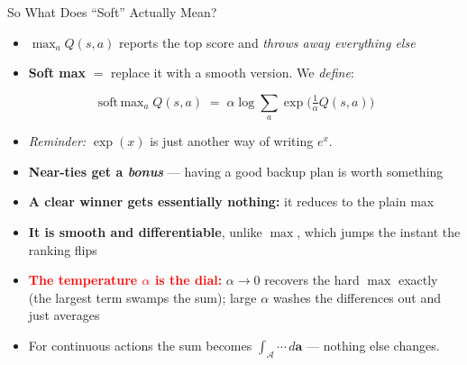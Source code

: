 \begin{frame}{So What Does ``Soft'' Actually Mean?}
\small
\begin{itemize}
    \item $\max_a Q(s,a)$ reports the top score and \emph{throws away everything else}
    \vspace{0.4em}
    \item \textbf{Soft max} $=$ replace it with a smooth version. We \emph{define}:
\end{itemize}
\vspace{-0.2em}
\[
\operatorname{soft\,max}_a Q(s,a) \;=\; \alpha \log \sum_a \exp\!\Big(\tfrac{1}{\alpha}Q(s,a)\Big)
\]
\vspace{-0.2em}
\begin{itemize}
    \item[] {\footnotesize \emph{Reminder:} $\exp(x)$ is just another way of writing $e^x$.}
    \vspace{0.5em}
    \item \textbf{Near-ties get a \emph{bonus}} --- having a good backup plan is worth something
    \vspace{0.2em}
    \item \textbf{A clear winner gets essentially nothing:} it reduces to the plain max
    \vspace{0.2em}
    \item \textbf{It is smooth and differentiable}, unlike $\max$, which jumps the instant the ranking flips
    \vspace{0.5em}
    \item \textcolor{red}{\textbf{The temperature $\alpha$ is the dial:}} $\alpha \to 0$ recovers the hard $\max$ exactly (the largest term swamps the sum); large $\alpha$ washes the differences out and just averages
    \vspace{0.2em}
    \item[] {\footnotesize For continuous actions the sum becomes $\int_{\mathcal{A}}\!\cdots\,d\mathbf{a}$ --- nothing else changes.}
\end{itemize}
\end{frame}

